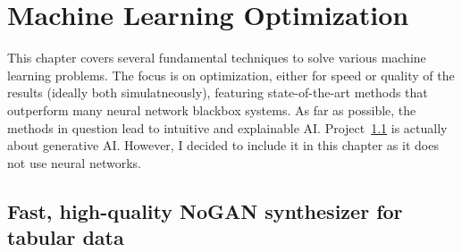 \documentclass[oneside,10pt]{book}
\begin{document}
\chapter{Machine Learning Optimization}



\begin{comment}
xxxx put the following in previous chapter:

xxx

projects
   feature clustering
   generalized geometric distrib
   data thinning 
   xgboost nlp
   curve fitting 
   fourier regression, better than polynomial regression [data transform]
   time series in cloud regression / numerical instability
   smart search grid
   curve smoothing
   mpmath, gmpy2
   stochastic integral equation

xxxx data transforms
xxxx check for xxxx and ?? when finished
xxxxx faster code with no loop; see my gmpy2 app
xxxx unix command in notebook . showing image. pip install ctrl-V to paste
xxx time series: when curve fitting won't work: in ML certif [add 250 simuls curve fitting]

cloud regression / curve fitting
math-free gradient 
feature clustering
data thinning
smart search grid
\end{comment}

This chapter covers several fundamental techniques to solve various machine learning problems. The focus is on
 optimization, either for speed or quality of the results (ideally both simulatneously), featuring state-of-the-art methods
 that outperform many neural network blackbox systems. As far as possible, the methods in question lead to
 intuitive and explainable AI. Project~\ref{genaiyert} is actually about generative AI. However, I decided to include it in this chapter
 as it does not use neural networks.

\section{Fast, high-quality NoGAN synthesizer for tabular data}\label{genaiyert}
\end{document}
